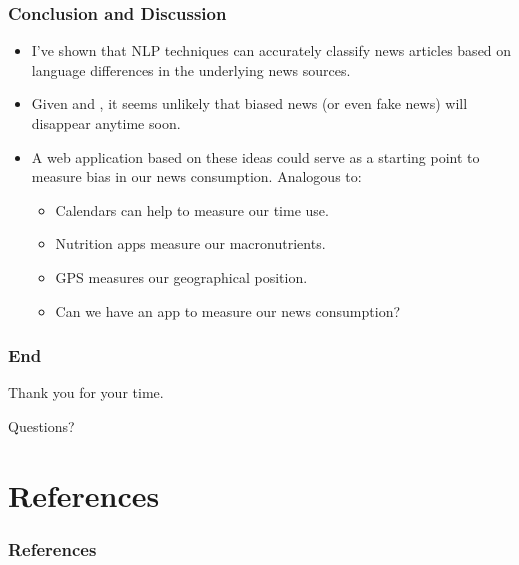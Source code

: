 \documentclass{beamer}
\begin{document}
     \begin{frame}
    	\frametitle{Conclusion and Discussion}
    	\begin{itemize}
    		\item I've shown that NLP techniques can accurately classify news articles based on language differences in the underlying news sources. 
    		\item Given \citet{gentzkow2008competition} and \citet{gentzkow2006media}, it seems unlikely that biased news (or even fake news) will disappear anytime soon. 
    		\item A web application based on these ideas could serve as a starting point to measure bias in our news consumption. Analogous to: 
    		\begin{itemize}
    			\item Calendars can help to measure our time use.
    			\item Nutrition apps measure our macronutrients. 
    			\item GPS measures our geographical position.
    			\item Can we have an app to measure our news consumption? 
    		\end{itemize} 
    	\end{itemize}
    \end{frame}

    \begin{frame}
    	\frametitle{End}
    	\centering \Huge Thank you for your time.
    	
    	\centering Questions?
    \end{frame}


\section{References}
	\begingroup
	\tiny
    \begin{frame}
    	\frametitle{References}
    	
    	
    \end{frame}
    \endgroup
\end{document}
